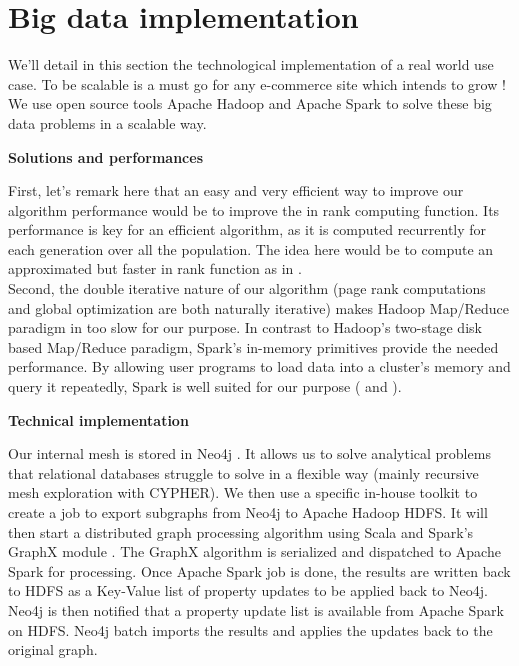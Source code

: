 \documentclass{iSWAGArticle}
\begin{document}
\section{Big data implementation}
We'll detail in this section the technological implementation of a real world use case.
To be scalable is a must go for any e-commerce site which intends to grow !
We use open source tools Apache Hadoop \cite{apache_hadoop} and Apache Spark \cite{spark} to solve these big data problems in a scalable way. 
\begin{center}
\textbf{\large Solutions and performances}
\end{center}
First, let's remark here that an easy and very efficient way to improve our algorithm performance would be to improve the in rank computing function. Its performance is key for an efficient algorithm, as it
is computed recurrently for each generation over all the population. The idea here would be to compute an approximated but faster in rank function as in \cite{page_rank_approx}.
\\\newline
Second, the double iterative nature of our algorithm (page rank computations and global optimization are both naturally iterative)
makes Hadoop Map/Reduce paradigm in \cite{map_reduce} too slow for our purpose. 
In contrast to Hadoop's two-stage disk based Map/Reduce paradigm, Spark's in-memory primitives provide the needed performance.
By allowing user programs to load data into a cluster's memory and query it repeatedly, Spark is well suited for our purpose (\cite{incremental_ram} and
\cite{spark_methodo}).
\\\newline
\begin{center}
\textbf{\large Technical implementation}
\end{center}
Our internal mesh is stored in Neo4j \cite{neo4j}. It allows us to solve analytical problems
 that relational databases struggle to solve in a flexible way (mainly recursive mesh exploration with CYPHER). 
 We then use a specific in-house toolkit to create a job to export subgraphs from Neo4j to Apache Hadoop HDFS.
 It will then start a distributed graph processing algorithm using Scala \cite{scala} and Spark's GraphX module \cite{graphX}. 
 The GraphX algorithm is serialized and dispatched to Apache Spark for processing.
Once Apache Spark job is done, the results are written back to HDFS as a Key-Value list of property updates to be applied back to Neo4j.
Neo4j is then notified that a property update list is available from Apache Spark on HDFS. Neo4j batch imports the results and applies the updates back to the original graph.
\end{document}
